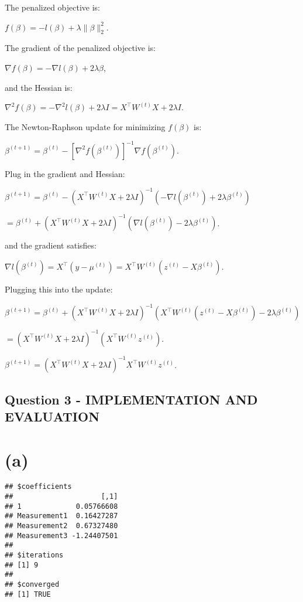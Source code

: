 \documentclass[12pt,halfline,a4paper,]{ouparticle}
\begin{document}
The penalized objective is:

\(f(\beta) = -l(\beta) + \lambda \|\beta\|_2^2\).

The gradient of the penalized objective is:

\(\nabla f(\beta) = -\nabla l(\beta) + 2 \lambda \beta\),

and the Hessian is:

\(\nabla^2 f(\beta) = -\nabla^2 l(\beta) + 2 \lambda I = X^\top W^{(t)} X + 2 \lambda I\).

The Newton-Raphson update for minimizing \(f(\beta)\) is:

\(\beta^{(t+1)} = \beta^{(t)} - [\nabla^2 f(\beta^{(t)})]^{-1} \nabla f(\beta^{(t)})\).

Plug in the gradient and Hessian:

\(\beta^{(t+1)} = \beta^{(t)} - (X^\top W^{(t)} X + 2 \lambda I)^{-1} (-\nabla l(\beta^{(t)}) + 2 \lambda \beta^{(t)})\)

\(= \beta^{(t)} + (X^\top W^{(t)} X + 2 \lambda I)^{-1} (\nabla l(\beta^{(t)}) - 2 \lambda \beta^{(t)})\).

and the gradient satisfies:

\(\nabla l(\beta^{(t)}) = X^\top (y - \mu^{(t)}) = X^\top W^{(t)} (z^{(t)} - X \beta^{(t)})\).

Plugging this into the update:

\(\beta^{(t+1)} = \beta^{(t)} + (X^\top W^{(t)} X + 2 \lambda I)^{-1} (X^\top W^{(t)} (z^{(t)} - X \beta^{(t)}) - 2 \lambda \beta^{(t)})\)

\(= (X^\top W^{(t)} X + 2 \lambda I)^{-1} (X^\top W^{(t)} z^{(t)})\).

\(\beta^{(t+1)} = (X^\top W^{(t)} X + 2 \lambda I)^{-1} X^\top W^{(t)} z^{(t)}\).

\subsection{Question 3 - IMPLEMENTATION AND
EVALUATION}\label{question-3---implementation-and-evaluation}

\section{(a)}\label{a}

\begin{verbatim}
## $coefficients
##                     [,1]
## 1             0.05766608
## Measurement1  0.16427287
## Measurement2  0.67327480
## Measurement3 -1.24407501
## 
## $iterations
## [1] 9
## 
## $converged
## [1] TRUE
\end{verbatim}
\end{document}
